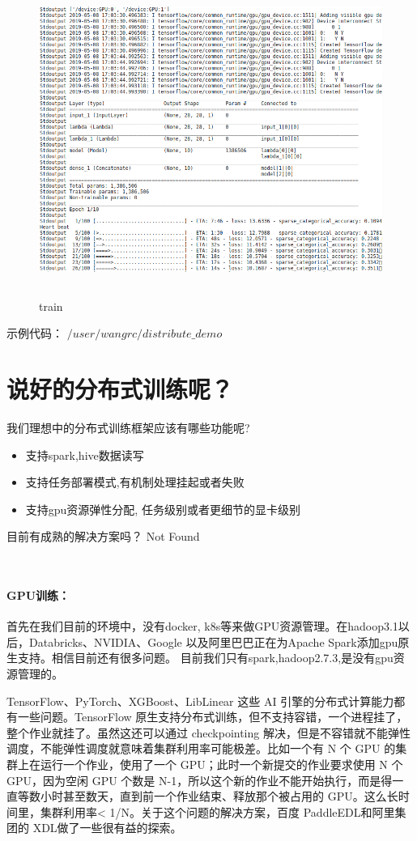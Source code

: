 \documentclass[12pt,a4paper,oneside]{article}
\begin{document}
\begin{CJK*}{UTF8}{gbsn}
\begin{figure}[H] 
\centering
\includegraphics[width=6in,height=4in]{train2}
\caption{train}
\end{figure}

示例代码：
$/user/wangrc/distribute \_ demo$

\section{说好的分布式训练呢？}
我们理想中的分布式训练框架应该有哪些功能呢?
\begin{itemize}
\item 支持spark,hive数据读写
\item 支持任务部署模式,有机制处理挂起或者失败
\item 支持gpu资源弹性分配, 任务级别或者更细节的显卡级别
\end{itemize}
目前有成熟的解决方案吗？ Not Found

~\\
\paragraph{GPU训练：}  首先在我们目前的环境中，没有docker, k8s等来做GPU资源管理。在hadoop3.1以后，Databricks、NVIDIA、Google 以及阿里巴巴正在为Apache Spark添加gpu原生支持。相信目前还有很多问题。 目前我们只有spark,hadoop2.7.3,是没有gpu资源管理的。

TensorFlow、PyTorch、XGBoost、LibLinear 这些 AI 引擎的分布式计算能力都有一些问题。TensorFlow 原生支持分布式训练，但不支持容错，一个进程挂了，整个作业就挂了。虽然这还可以通过 checkpointing 解决，但是不容错就不能弹性调度，不能弹性调度就意味着集群利用率可能极差。比如一个有 N 个 GPU 的集群上在运行一个作业，使用了一个 GPU；此时一个新提交的作业要求使用 N 个 GPU，因为空闲 GPU 个数是 N-1，所以这个新的作业不能开始执行，而是得一直等数小时甚至数天，直到前一个作业结束、释放那个被占用的 GPU。这么长时间里，集群利用率< 1/N。关于这个问题的解决方案，百度 PaddleEDL和阿里集团的 XDL做了一些很有益的探索。


\end{CJK*}
\end{document}
